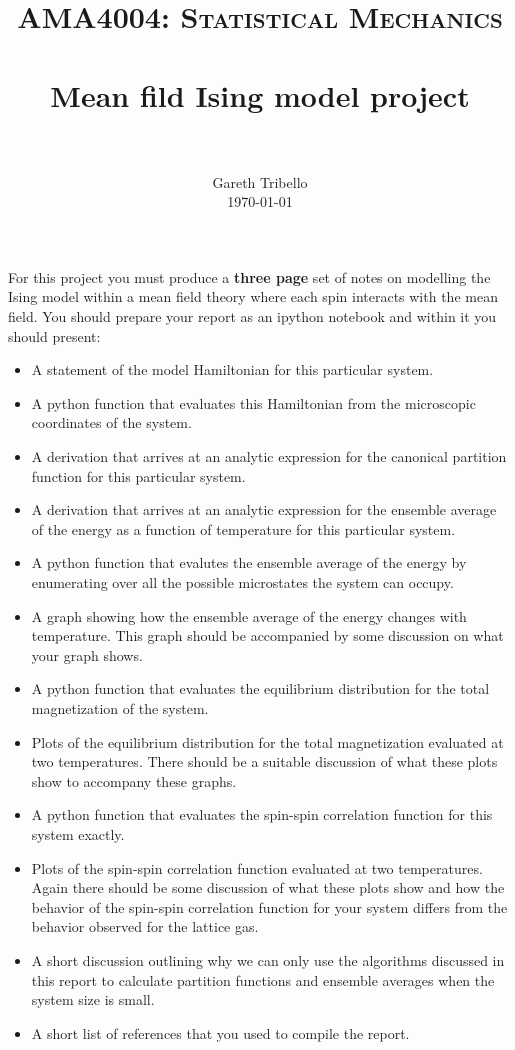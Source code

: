\documentclass[paper=a4, fontsize=11pt]{scrartcl}
\title{\usefont{OT1}{bch}{b}{n} \normalfont \normalsize \textsc{AMA4004:
Statistical Mechanics} \\ [25pt] \horrule{0.5pt} \\[0.4cm] 
\huge Mean fild Ising model project \\
\horrule{2pt} \\[0.25cm]
}
\author{ \normalfont
\normalsize
        Gareth Tribello \\[-3pt] \normalsize
        \today
}
\date{}
\numberwithin{equation}{section}
\numberwithin{figure}{section}
\numberwithin{table}{section}
\begin{document}
\maketitle

For this project you must produce a {\bf three page} set of notes on modelling the Ising model within a mean field theory where each spin interacts with the mean field.  You should prepare your report as an ipython notebook and within 
it you should present:

\begin{itemize}
 \item A statement of the model Hamiltonian for this particular system.
 \item A python function that evaluates this Hamiltonian from the microscopic coordinates of the system. 
 \item A derivation that arrives at an analytic expression for the canonical partition function for this particular system.
 \item A derivation that arrives at an analytic expression for the ensemble average of the energy as a function of temperature for this particular system.
 \item A python function that evalutes the ensemble average of the energy by enumerating over all the possible microstates the system can occupy.  
 \item A graph showing how the ensemble average of the energy changes with temperature.  This graph should be accompanied by some discussion on what your graph shows.
 \item A python function that evaluates the equilibrium distribution for the total magnetization of the system.
 \item Plots of the equilibrium distribution for the total magnetization evaluated at two temperatures.  There should be a suitable discussion of what these plots show to accompany these graphs.
 \item A python function that evaluates the spin-spin correlation function for this system exactly.
 \item Plots of the spin-spin correlation function evaluated at two temperatures.  Again there should be some discussion of what these plots show and how the behavior of the spin-spin correlation function for your system differs from the behavior observed for the lattice gas.
 \item A short discussion outlining why we can only use the algorithms discussed in this report to calculate partition functions and ensemble averages when the system size is small.
 \item A short list of references that you used to compile the report.
\end{itemize}
\end{document}
